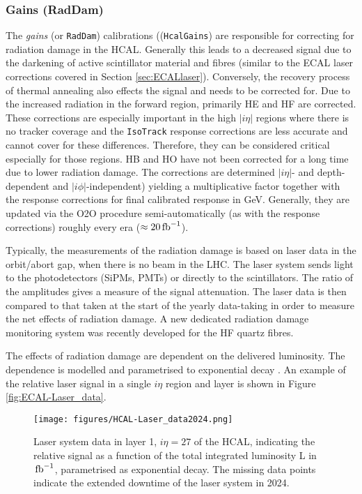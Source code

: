 \subsubsection{Gains (RadDam)}\label{sec:HCAL_gains}
The  \textit{gains} (or \texttt{RadDam}) calibrations ((\texttt{HcalGains}) are responsible for correcting for radiation damage in the HCAL. Generally this leads to a decreased signal due to the darkening of active scintillator material and fibres (similar to the ECAL laser corrections covered in Section \ref{sec:ECALlaser}). Conversely, the recovery process of thermal annealing also effects the signal and needs to be corrected for. Due to the increased radiation in the forward region, primarily HE and HF are corrected. These corrections are especially important in the high $|i\eta|$ regions where there is no tracker coverage and the \texttt{IsoTrack} response corrections are less accurate and cannot cover for these differences. Therefore, they can be considered critical especially for those regions. HB and HO have not been corrected for a long time due to lower radiation damage. The corrections are determined $|i\eta|$- and depth-dependent and $|i\phi|$-independent) yielding a multiplicative factor together with the response corrections for final calibrated response in GeV. Generally, they are updated via the O2O procedure semi-automatically (as with the response corrections) roughly every era ($\approx 20 \mbox{\ensuremath{\,\text{fb}^{-1}}}$).

Typically, the measurements of the radiation damage is based on laser data in the orbit/abort gap, when there is no beam in the LHC. The laser system sends light to the photodetectors (SiPMs, PMTs) or directly to the scintillators. The ratio of the amplitudes gives a measure of the signal attenuation. The laser data is then compared to that taken at the start of the yearly data-taking in order to measure the net effects of radiation damage. A new dedicated radiation damage monitoring system was recently developed for the HF quartz fibres. 

The effects of radiation damage are dependent on the delivered luminosity. The dependence is modelled and parametrised to exponential decay \cite{CMS-PRF-18-003}. An example of the relative laser signal in a single $i\eta$ region and layer is shown in Figure \ref{fig:ECAL-Laser_data}. 

\begin{figure}[h!]	
\centering
\texttt{[image: figures/HCAL-Laser\_data2024.png]} %
\caption{Laser system data in layer 1, $i\eta = 27$ of the HCAL, indicating the relative signal as a function of the total integrated luminosity L in $\mbox{\ensuremath{\,\text{fb}^{-1}}}$, parametrised as exponential decay. The missing data points indicate the extended downtime of the laser system in 2024.}
\label{fig:HCAL-Laser_data}
\end{figure}

